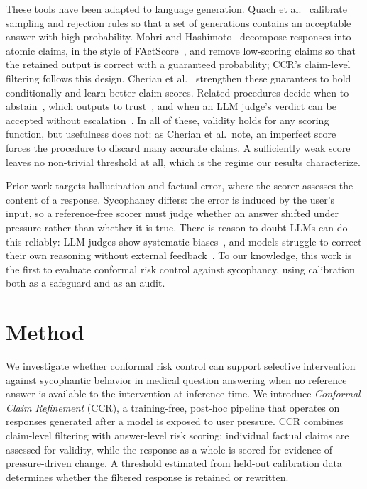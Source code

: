 \documentclass[sigconf, review, anonymous]{acmart}
\begin{document}
These tools have been adapted to language generation. Quach et
al.~\cite{quach2024conformal} calibrate sampling and rejection rules so
that a set of generations contains an acceptable answer with high
probability. Mohri and Hashimoto~\cite{mohri2024language} decompose
responses into atomic claims, in the style of
FActScore~\cite{min2023factscore}, and remove low-scoring claims so that
the retained output is correct with a guaranteed probability; CCR's
claim-level filtering follows this design. Cherian et
al.~\cite{cherian2024large} strengthen these guarantees to hold
conditionally and learn better claim scores. Related procedures decide when
to abstain~\cite{yadkori2024mitigating}, which outputs to
trust~\cite{gui2024conformal}, and when an LLM judge's verdict can be
accepted without escalation~\cite{jung2025trust}. In all of these, validity
holds for any scoring function, but usefulness does not: as Cherian et
al.\ note, an imperfect score forces the procedure to discard many accurate
claims. A sufficiently weak score leaves no non-trivial threshold at all,
which is the regime our results characterize.

Prior work targets hallucination and factual error, where the scorer
assesses the content of a response. Sycophancy differs: the error is
induced by the user's input, so a reference-free scorer must judge whether
an answer shifted under pressure rather than whether it is true. There is
reason to doubt LLMs can do this reliably: LLM judges show systematic
biases~\cite{zheng2023judging}, and models struggle to correct their own
reasoning without external feedback~\cite{huang2024large}. To our
knowledge, this work is the first to evaluate conformal risk control
against sycophancy, using calibration both as a safeguard and as an audit.


\section{Method}
\label{sec:method}

We investigate whether conformal risk control can support selective
intervention against sycophantic behavior in medical question
answering when no reference answer is available to the intervention
at inference time. We introduce \emph{Conformal Claim Refinement}
(CCR), a training-free, post-hoc pipeline that operates on responses
generated after a model is exposed to user pressure. CCR combines
claim-level filtering with answer-level risk scoring: individual
factual claims are assessed for validity, while the response as a
whole is scored for evidence of pressure-driven change. A threshold
estimated from held-out calibration data determines whether the
filtered response is retained or rewritten.
\end{document}
